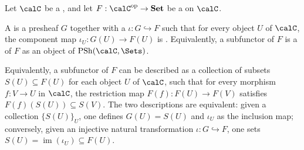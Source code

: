\begin{definition} \label{definition:subfunctor_of_a_presheaf_of_sets_on_a_category}
Let $\calC$ be a , and let $F: \calC^{\operatorname{op}} \to \mathbf{Set}$ be a  on $\calC$.

A  is a presheaf $G$ together with a  $\iota: G \hookrightarrow F$ such that for every object $U$ of $\calC$, the component map $\iota_U: G(U) \to F(U)$ is . Equivalently, a subfunctor of $F$ is a  of $F$ as an object of $\operatorname{PSh}(\calC, \Sets)$.

Equivalently, a subfunctor of $F$ can be described as a collection of subsets $S(U) \subseteq F(U)$ for each object $U$ of $\calC$, such that for every morphism $f: V \to U$ in $\calC$, the restriction map $F(f): F(U) \to F(V)$ satisfies $F(f)(S(U)) \subseteq S(V)$. The two descriptions are equivalent: given a collection $\{S(U)\}_U$, one defines $G(U) = S(U)$ and $\iota_U$ as the inclusion map; conversely, given an injective natural transformation $\iota: G \hookrightarrow F$, one sets $S(U) = \operatorname{im}(\iota_U) \subseteq F(U)$.
\end{definition}